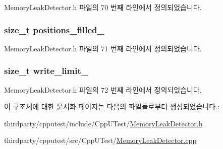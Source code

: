 Memory\+Leak\+Detector.\+h 파일의 70 번째 라인에서 정의되었습니다.

\subsubsection[{\texorpdfstring{positions\+\_\+filled\+\_\+}{positions_filled_}}]{\setlength{\rightskip}{0pt plus 5cm}size\+\_\+t positions\+\_\+filled\+\_\+\hspace{0.3cm}{\ttfamily [private]}}\hypertarget{struct_simple_string_buffer_ad38da5740fb5613e7c7745641be11761}{}\label{struct_simple_string_buffer_ad38da5740fb5613e7c7745641be11761}


Memory\+Leak\+Detector.\+h 파일의 71 번째 라인에서 정의되었습니다.

\subsubsection[{\texorpdfstring{write\+\_\+limit\+\_\+}{write_limit_}}]{\setlength{\rightskip}{0pt plus 5cm}size\+\_\+t write\+\_\+limit\+\_\+\hspace{0.3cm}{\ttfamily [private]}}\hypertarget{struct_simple_string_buffer_a90266a524d354421a6fd68337917d395}{}\label{struct_simple_string_buffer_a90266a524d354421a6fd68337917d395}


Memory\+Leak\+Detector.\+h 파일의 72 번째 라인에서 정의되었습니다.



이 구조체에 대한 문서화 페이지는 다음의 파일들로부터 생성되었습니다.\+:\begin{DoxyCompactItemize}
\item 
thirdparty/cpputest/include/\+Cpp\+U\+Test/\hyperlink{_memory_leak_detector_8h}{Memory\+Leak\+Detector.\+h}\item 
thirdparty/cpputest/src/\+Cpp\+U\+Test/\hyperlink{_memory_leak_detector_8cpp}{Memory\+Leak\+Detector.\+cpp}\end{DoxyCompactItemize}
